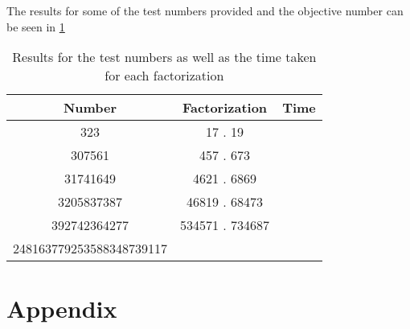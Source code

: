 \documentclass{article}
\begin{document}
The results for some of the test numbers provided and the objective number can be seen in \ref{tab:results}

\begin{table}[h]
    \centering
    \begin{tabular}{|c|c|c|}
    \hline
        Number       & Factorization   & Time \\ \hline \hline
        323          &  17 . 19        &      \\ \hline
        307561       & 457 . 673       &       \\ \hline
        31741649     & 4621 . 6869     &       \\ \hline
        3205837387   & 46819 . 68473   &       \\ \hline
        392742364277 & 534571 . 734687 &       \\ \hline
        248163779253588348739117 &     &        \\
    \hline
    \end{tabular}
    \caption{Results for the test numbers as well as the time taken for each factorization}
    \label{tab:results}
\end{table}






\section{Appendix}
\end{document}
